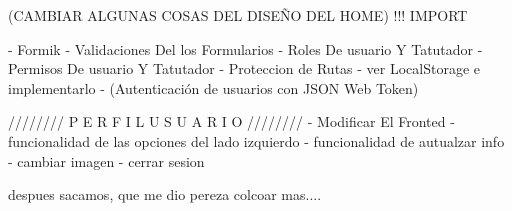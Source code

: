(CAMBIAR ALGUNAS COSAS DEL DISEÑO DEL HOME) !!! IMPORT 


- Formik
- Validaciones Del los Formularios 
- Roles De usuario Y Tatutador
- Permisos De usuario Y Tatutador
- Proteccion de Rutas
- ver LocalStorage e implementarlo
- (Autenticación de usuarios con JSON Web Token)


////////   P E R F I L   U S U A R I O   ////////  
- Modificar El Fronted
- funcionalidad de las opciones del lado izquierdo
- funcionalidad de autualzar info 
- cambiar imagen
- cerrar sesion 

despues sacamos, que me dio pereza colcoar mas....


